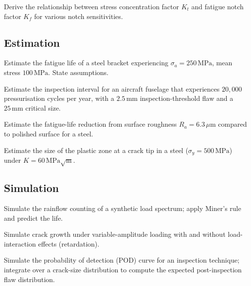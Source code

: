 \begin{exercise}
Derive the relationship between stress concentration factor $K_t$ and fatigue notch factor $K_f$ for various notch sensitivities.
\end{exercise}

\subsection*{Estimation}

\begin{exercise}
Estimate the fatigue life of a steel bracket experiencing $\sigma_a = 250\,\text{MPa}$, mean stress $100\,\text{MPa}$. State assumptions.
\end{exercise}

\begin{exercise}
Estimate the inspection interval for an aircraft fuselage that experiences $20{,}000$ pressurisation cycles per year, with a $2.5\,\text{mm}$ inspection-threshold flaw and a $25\,\text{mm}$ critical size.
\end{exercise}

\begin{exercise}
Estimate the fatigue-life reduction from surface roughness $R_a = 6.3\,\mu\text{m}$ compared to polished surface for a steel.
\end{exercise}

\begin{exercise}
Estimate the size of the plastic zone at a crack tip in a steel ($\sigma_y = 500\,\text{MPa}$) under $K = 60\,\text{MPa}\sqrt{\text{m}}$.
\end{exercise}

\subsection*{Simulation}

\begin{exercise}
Simulate the rainflow counting of a synthetic load spectrum; apply Miner's rule and predict the life.
\end{exercise}

\begin{exercise}
Simulate crack growth under variable-amplitude loading with and without load-interaction effects (retardation).
\end{exercise}

\begin{exercise}
Simulate the probability of detection (POD) curve for an inspection technique; integrate over a crack-size distribution to compute the expected post-inspection flaw distribution.
\end{exercise}

